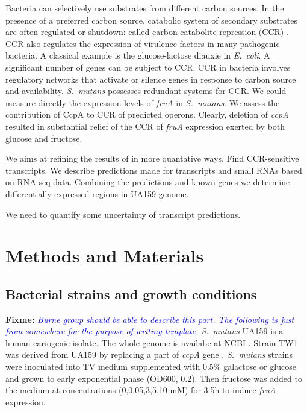 \documentclass{article}
\newcommand{\fixme}[1]{{\textbf{Fixme:} \textit{\textcolor{blue}{#1}}}}
\begin{document}
Bacteria can selectively use substrates from different carbon sources. In the
presence of a preferred carbon source, catabolic system of secondary substrates
are often regulated or shutdown: called carbon catabolite repression (CCR)
\cite{Gorke2008}. CCR also regulates the expression of virulence factors in many
pathogenic bacteria. A classical example is the glucose-lactose diauxie in
\textit{E.\ coli}. A significant number of genes can be subject to CCR.  CCR in
bacteria involves regulatory networks that activate or silence genes in response
to carbon source and availability.  \textit{S.\ mutans} possesses redundant
systems for CCR.  We could measure directly the expression levels of
\textit{fruA} in \textit{S.\ mutans}.  We assess the contribution of CcpA to CCR
of predicted operons.  Clearly, deletion of \textit{ccpA} resulted in
substantial relief of the CCR of \textit{fruA} expression exerted by both
glucose and fructose.

We aims at refining the results of \cite{Abranches2008} in more quantative ways.
Find CCR-sensitive transcripts. We describe predictions made for transcripts and
small RNAs based on RNA-seq data. Combining the predictions and known genes we
determine differentially expressed regions in UA159 genome. 

We need to quantify some uncertainty of transcript predictions.

\section{Methods and Materials}

\subsection{Bacterial strains and growth conditions}
\fixme{Burne group should be able to describe this part. The following is just
from somewhere for the purpose of writing template.}
\textit{S.\ mutans} UA159 is a human cariogenic isolate. The whole genome is
availabe at NCBI \cite{Ajdic2002}. Strain TW1 was derived from UA159 by
replacing a part of \textit{ccpA} gene \cite{Wen2002}.  \textit{S.\ mutans}
strains were inoculated into TV medium supplemented with 0.5\% galactose or
glucose and grown to early exponential phase (OD600, 0.2).  Then fructose was
added to the medium at concentrations (0,0.05,3,5,10 mM) for 3.5h to induce
\textit{fruA} expression.
\end{document}
